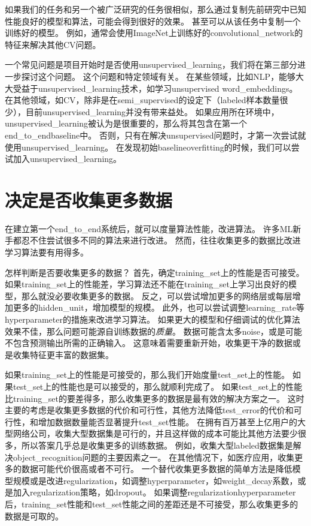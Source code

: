 如果我们的任务和另一个被广泛研究的任务很相似，那么通过复制先前研究中已知性能良好的模型和算法，可能会得到很好的效果。
甚至可以从该任务中复制一个训练好的模型。
例如，通常会使用ImageNet上训练好的\gls{convolutional_network}的特征来解决其他\gls{CV}问题\citep{girshickregion}。


一个常见问题是项目开始时是否使用\gls{unsupervised_learning}，我们将在第三部分进一步探讨这个问题。
 这个问题和特定领域有关。
在某些领域，比如\gls{NLP}，能够大大受益于\gls{unsupervised_learning}技术，如学习\gls{unsupervised} \gls{word_embeddings}。
在其他领域，如\gls{CV}，除非是在\gls{semi_supervised}的设定下（\gls{labeled}样本数量很少）\citep{Kingma-et-al-NIPS2014,Rasmus-et-al-arxiv2015}，目前\gls{unsupervised_learning}并没有带来益处。
如果应用所在环境中，\gls{unsupervised_learning}被认为是很重要的，那么将其包含在第一个\gls{end_to_end}\gls{baseline}中。
否则，只有在解决\gls{unsupervised}问题时，才第一次尝试就使用\gls{unsupervised_learning}。
在发现初始\gls{baseline}\gls{overfitting}的时候，我们可以尝试加入\gls{unsupervised_learning}。


\section{决定是否收集更多数据}
\label{sec:determining_whether_to_gather_more_data}

在建立第一个\gls{end_to_end}系统后，就可以度量算法性能，改进算法。
许多\gls{ML}新手都忍不住尝试很多不同的算法来进行改进。
然而，往往收集更多的数据比改进学习算法要有用得多。


怎样判断是否要收集更多的数据？
首先，确定\gls{training_set}上的性能是否可接受。
如果\gls{training_set}上的性能差，学习算法还不能在\gls{training_set}上学习出良好的模型，那么就没必要收集更多的数据。
反之，可以尝试增加更多的网络层或每层增加更多的\gls{hidden_unit}，增加模型的规模。
此外，也可以尝试调整\gls{learning_rate}等\gls{hyperparameter}的措施来改进学习算法。
如果更大的模型和仔细调试的优化算法效果不佳，那么问题可能源自训练数据的\emph{质量}。
数据可能含太多\gls{noise}，或是可能不包含预测输出所需的正确输入。
这意味着需要重新开始，收集更干净的数据或是收集特征更丰富的数据集。


如果\gls{training_set}上的性能是可接受的，那么我们开始度量\gls{test_set}上的性能。
如果\gls{test_set}上的性能也是可以接受的，那么就顺利完成了。
如果\gls{test_set}上的性能比\gls{training_set}的要差得多，那么收集更多的数据是最有效的解决方案之一。
这时主要的考虑是收集更多数据的代价和可行性，其他方法降低\gls{test_error}的代价和可行性，和增加数据数量能否显著提升\gls{test_set}性能。
在拥有百万甚至上亿用户的大型网络公司，收集大型数据集是可行的，并且这样做的成本可能比其他方法要少很多，所以答案几乎总是收集更多的训练数据。
例如，收集大型\gls{labeled}数据集是解决\gls{object_recognition}问题的主要因素之一。
在其他情况下，如医疗应用，收集更多的数据可能代价很高或者不可行。
一个替代收集更多数据的简单方法是降低模型规模或是改进\gls{regularization}，如调整\gls{hyperparameter}，如\gls{weight_decay}系数，或是加入\gls{regularization}策略，如\gls{dropout}。%
如果调整\gls{regularization}\gls{hyperparameter}后，\gls{training_set}性能和\gls{test_set}性能之间的差距还是不可接受，那么收集更多的数据是可取的。


